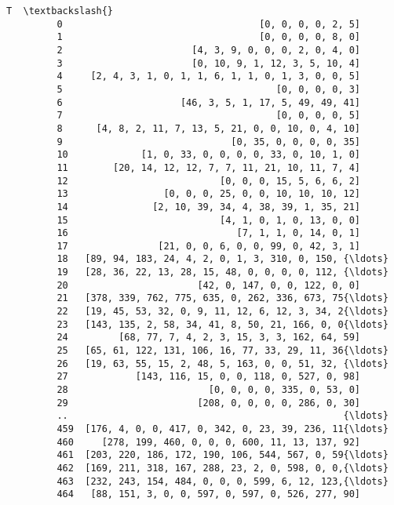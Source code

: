 \documentclass[11pt]{article}
\begin{document}
\begin{Verbatim}[commandchars=\\\{\}]
                                                              T  \textbackslash{}
         0                                   [0, 0, 0, 0, 2, 5]   
         1                                   [0, 0, 0, 0, 8, 0]   
         2                       [4, 3, 9, 0, 0, 0, 2, 0, 4, 0]   
         3                       [0, 10, 9, 1, 12, 3, 5, 10, 4]   
         4     [2, 4, 3, 1, 0, 1, 1, 6, 1, 1, 0, 1, 3, 0, 0, 5]   
         5                                      [0, 0, 0, 0, 3]   
         6                     [46, 3, 5, 1, 17, 5, 49, 49, 41]   
         7                                      [0, 0, 0, 0, 5]   
         8      [4, 8, 2, 11, 7, 13, 5, 21, 0, 0, 10, 0, 4, 10]   
         9                              [0, 35, 0, 0, 0, 0, 35]   
         10             [1, 0, 33, 0, 0, 0, 0, 33, 0, 10, 1, 0]   
         11        [20, 14, 12, 12, 7, 7, 11, 21, 10, 11, 7, 4]   
         12                           [0, 0, 0, 15, 5, 6, 6, 2]   
         13                 [0, 0, 0, 25, 0, 0, 10, 10, 10, 12]   
         14               [2, 10, 39, 34, 4, 38, 39, 1, 35, 21]   
         15                           [4, 1, 0, 1, 0, 13, 0, 0]   
         16                              [7, 1, 1, 0, 14, 0, 1]   
         17                [21, 0, 0, 6, 0, 0, 99, 0, 42, 3, 1]   
         18   [89, 94, 183, 24, 4, 2, 0, 1, 3, 310, 0, 150, {\ldots}   
         19   [28, 36, 22, 13, 28, 15, 48, 0, 0, 0, 0, 112, {\ldots}   
         20                       [42, 0, 147, 0, 0, 122, 0, 0]   
         21   [378, 339, 762, 775, 635, 0, 262, 336, 673, 75{\ldots}   
         22   [19, 45, 53, 32, 0, 9, 11, 12, 6, 12, 3, 34, 2{\ldots}   
         23   [143, 135, 2, 58, 34, 41, 8, 50, 21, 166, 0, 0{\ldots}   
         24         [68, 77, 7, 4, 2, 3, 15, 3, 3, 162, 64, 59]   
         25   [65, 61, 122, 131, 106, 16, 77, 33, 29, 11, 36{\ldots}   
         26   [19, 63, 55, 15, 2, 48, 5, 163, 0, 0, 51, 32, {\ldots}   
         27            [143, 116, 15, 0, 0, 118, 0, 527, 0, 98]   
         28                         [0, 0, 0, 0, 335, 0, 53, 0]   
         29                       [208, 0, 0, 0, 0, 286, 0, 30]   
         ..                                                 {\ldots}   
         459  [176, 4, 0, 0, 417, 0, 342, 0, 23, 39, 236, 11{\ldots}   
         460     [278, 199, 460, 0, 0, 0, 600, 11, 13, 137, 92]   
         461  [203, 220, 186, 172, 190, 106, 544, 567, 0, 59{\ldots}   
         462  [169, 211, 318, 167, 288, 23, 2, 0, 598, 0, 0,{\ldots}   
         463  [232, 243, 154, 484, 0, 0, 0, 599, 6, 12, 123,{\ldots}   
         464   [88, 151, 3, 0, 0, 597, 0, 597, 0, 526, 277, 90]   

\end{Verbatim}
\end{document}

